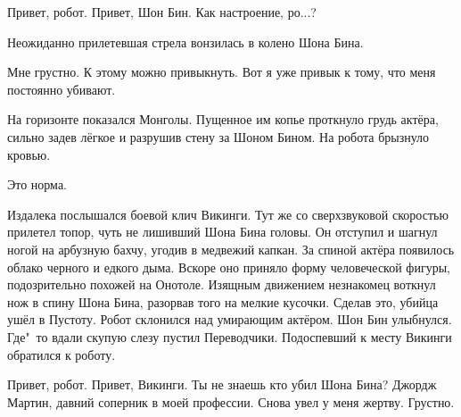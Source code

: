 {\footnotesize \begin{dialog}
\X Привет, робот.
\R Привет, Шон Бин.
\X Как настроение, ро...?
\end{dialog}

\begin{monolog}
Неожиданно прилетевшая стрела вонзилась в колено Шона Бина.
\end{monolog}

\begin{dialog}
\R Мне грустно.
\X К этому можно привыкнуть. Вот я уже привык к тому, что меня постоянно убивают.
\end{dialog}

\begin{monolog}
На горизонте показался Монголы. Пущенное им копье проткнуло грудь актёра, сильно задев лёгкое и разрушив стену за Шоном Бином. На робота брызнуло кровью.
\end{monolog}

\begin{dialog}
\X Это норма.
\end{dialog}

\begin{monolog}
Издалека послышался боевой клич Викинги. Тут же со сверхзвуковой скоростью прилетел топор, чуть не лишивший Шона Бина головы. Он отступил и шагнул ногой на арбузную бахчу, угодив в медвежий капкан. За спиной актёра появилось облако черного и едкого дыма. Вскоре оно приняло форму человеческой фигуры, подозрительно похожей на Онотоле. Изящным движением незнакомец воткнул нож в спину Шона Бина, разорвав того на мелкие кусочки. Сделав это, убийца ушёл в Пустоту. Робот склонился над умирающим актёром. Шон Бин улыбнулся. Где"~то вдали скупую слезу пустил Переводчики. Подоспевший к месту Викинги обратился к роботу.
\end{monolog}

\begin{dialog}
\X Привет, робот.
\R Привет, Викинги. Ты не знаешь кто убил Шона Бина?
\X Джордж Мартин, давний соперник в моей профессии. Снова увел у меня жертву.
\R Грустно.
\end{dialog}}